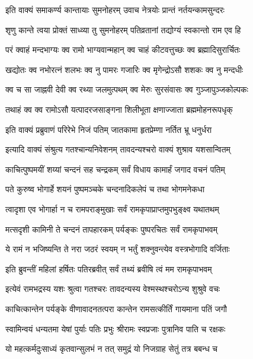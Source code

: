 \twolineshloka
{इति वाक्यं समाकर्ण्य कान्तायाः सुमनोहरम्}
{उवाच नेत्रयोः प्रान्तं नर्तयन्कामसुन्दरः}%

\twolineshloka
{शृणु कान्ते त्वया प्रोक्तं साध्व्या तु सुमनोहरम्}
{पतिव्रतानां तद्योग्यं स्वकान्तो राम एव हि}%

\twolineshloka
{परं क्वाहं मन्दभाग्यः क्व रामो भाग्यवान्महान्}
{क्व चाहं कीटवत्तुच्छः क्व ब्रह्मादिसुरार्चितः}%

\twolineshloka
{खद्योतः क्व नभोरत्नं शलभः क्व नु पामरः}
{गजारिः क्व मृगेन्द्रोऽसौ शशकः क्व नु मन्दधीः}%

\twolineshloka
{क्व च सा जाह्नवी देवी क्व रथ्या जलमुत्पथम्}
{क्व मेरुः सुरसंवासः क्व गुञ्जापुञ्जकोल्पकः}%

\twolineshloka
{तथाहं क्व क्व रामोऽसौ यत्पादरजसाङ्गना}
{शिलीभूता क्षणाज्जाता ब्रह्ममोहनरूपधृक्}%

\twolineshloka
{इति वाक्यं प्रब्रुवाणं परिरेभे निजं पतिम्}
{जातकामा हृतप्रेम्णा नर्तित भ्रू धनुर्धरा}%

\twolineshloka
{इत्यादि वाक्यं संश्रुत्य गतश्चान्यनिवेशनम्}
{तावदन्यश्चरो वाक्यं शुश्राव यशसान्वितम्}%

\twolineshloka
{काचित्पुष्पमयीं शय्यां चन्दनं सह चन्द्रकम्}
{सर्वं विधाय कामार्हं जगाद वचनं पतिम्}%

\twolineshloka
{पते कुरुष्व भोगार्हे शयनं पुष्पमञ्चके}
{चन्दनादिकलेपं च तथा भोगमनेकधा}%

\twolineshloka
{त्वादृशा एव भोगार्हा न च रामपराङ्मुखाः}
{सर्वं रामकृपाप्राप्तमुपभुङ्क्ष्व यथातथम्}%

\twolineshloka
{मत्सदृशी कामिनी ते चन्दनं तापहारकम्}
{पर्यङ्कः पुष्परचितः सर्वं रामकृपाभवम्}%

\twolineshloka
{ये रामं न भजिष्यन्ति ते नरा जठरं स्वयम्}
{न भर्तुं शक्नुवन्त्येव वस्त्रभोगादि वर्जिताः}%

\twolineshloka
{इति ब्रुवन्तीं महिलां हर्षितः पतिरब्रवीत्}
{सर्वं तथ्यं ब्रवीषि त्वं मम रामकृपाभवम्}%

\twolineshloka
{इत्येवं रामभद्रस्य यशः श्रुत्वा गतश्चरः}
{तावदन्यस्य वेश्मस्थश्चरोऽन्य शुश्रुवे वचः}%

\twolineshloka
{काचित्कान्तेन पर्यङ्के वीणावादनतत्परा}
{कान्तेन रामसत्कीर्तिं गायमाना पतिं जगौ}%

\twolineshloka
{स्वामिन्वयं धन्यतमा येषां पुर्याः पतिः प्रभुः}
{श्रीरामः स्वप्रजाः पुत्रानिव पाति च रक्षकः}%

\twolineshloka
{यो महत्कर्मदुःसाध्यं कृतवान्सुलभं न तत्}
{समुद्रं यो निजग्राह सेतुं तत्र बबन्ध च}%

